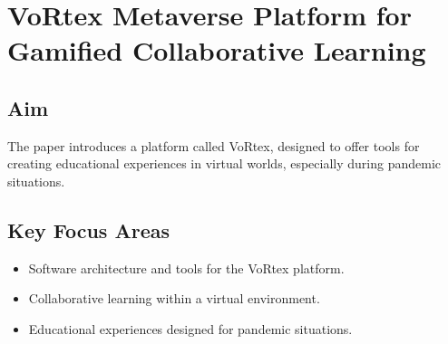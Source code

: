 \section{VoRtex Metaverse Platform for Gamified Collaborative Learning}

\subsection{Aim}
The paper introduces a platform called VoRtex, designed to offer tools for creating educational experiences in virtual worlds, especially during pandemic situations.

\subsection{Key Focus Areas}
\begin{itemize}
    \item Software architecture and tools for the VoRtex platform.
    \item Collaborative learning within a virtual environment.
    \item Educational experiences designed for pandemic situations.
\end{itemize}
